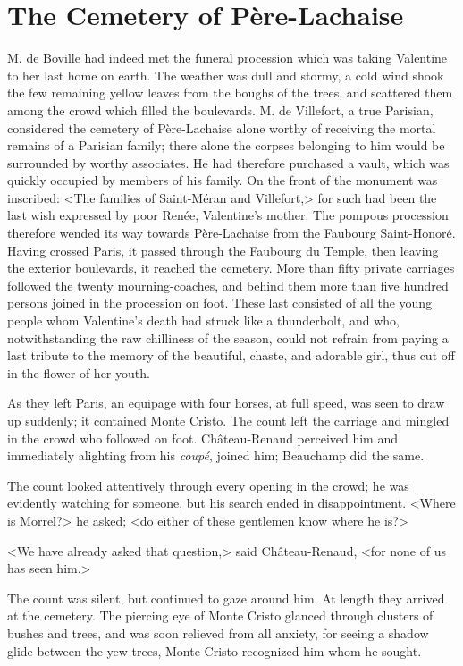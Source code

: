 \chapter{The Cemetery of Père-Lachaise} 
	
\lettrine{M}{.} de Boville had indeed met the funeral procession which was taking Valentine to her last home on earth. The weather was dull and stormy, a cold wind shook the few remaining yellow leaves from the boughs of the trees, and scattered them among the crowd which filled the boulevards. M. de Villefort, a true Parisian, considered the cemetery of Père-Lachaise alone worthy of receiving the mortal remains of a Parisian family; there alone the corpses belonging to him would be surrounded by worthy associates. He had therefore purchased a vault, which was quickly occupied by members of his family. On the front of the monument was inscribed: <The families of Saint-Méran and Villefort,> for such had been the last wish expressed by poor Renée, Valentine's mother. The pompous procession therefore wended its way towards Père-Lachaise from the Faubourg Saint-Honoré. Having crossed Paris, it passed through the Faubourg du Temple, then leaving the exterior boulevards, it reached the cemetery. More than fifty private carriages followed the twenty mourning-coaches, and behind them more than five hundred persons joined in the procession on foot.  These last consisted of all the young people whom Valentine's death had struck like a thunderbolt, and who, notwithstanding the raw chilliness of the season, could not refrain from paying a last tribute to the memory of the beautiful, chaste, and adorable girl, thus cut off in the flower of her youth. 

 As they left Paris, an equipage with four horses, at full speed, was seen to draw up suddenly; it contained Monte Cristo. The count left the carriage and mingled in the crowd who followed on foot. Château-Renaud perceived him and immediately alighting from his \textit{coupé}, joined him; Beauchamp did the same. 

 The count looked attentively through every opening in the crowd; he was evidently watching for someone, but his search ended in disappointment.  <Where is Morrel?> he asked; <do either of these gentlemen know where he is?> 

 <We have already asked that question,> said Château-Renaud, <for none of us has seen him.> 

 The count was silent, but continued to gaze around him. At length they arrived at the cemetery. The piercing eye of Monte Cristo glanced through clusters of bushes and trees, and was soon relieved from all anxiety, for seeing a shadow glide between the yew-trees, Monte Cristo recognized him whom he sought. 

